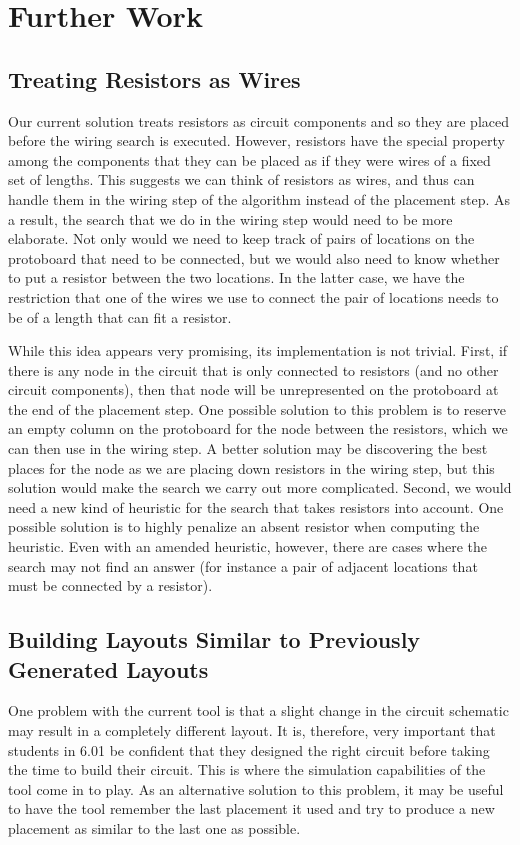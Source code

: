 \section{Further Work}

\subsection{Treating Resistors as Wires}

Our current solution treats resistors as circuit components and so they are
placed before the wiring search is executed.
However, resistors have the special property among the components that
they can be placed as if they were wires of a fixed set of lengths.
This suggests we can think of resistors as wires,
and thus can handle them in the wiring step of the algorithm instead of
the placement step. As a result, the search that we do in the wiring step would
need to be
more elaborate. Not only would we need to keep track of pairs of locations on the
protoboard that need to be connected, but we would also need to know whether to
put a resistor between the two locations. In the latter case, we have the
restriction that one of the wires we use to connect the pair of locations needs
to be of a length that can fit a resistor.

While this idea appears very promising, its implementation is not trivial.
First, if there is any node in the circuit that is only
connected to resistors (and no other circuit components), then that node will be
unrepresented on the protoboard at the end of the placement step. One possible
solution to this problem is to reserve an empty column on the
protoboard for the node between the resistors, which we can then use in the
wiring step. A better solution may
be discovering the best places for the node as we are placing down resistors in
the wiring step, but this solution would make the search we carry out
more complicated. Second, we would need a new kind of heuristic for the
search that takes resistors into account. One possible solution is to highly
penalize an absent resistor when computing the heuristic.
Even with an amended heuristic, however, there
are cases where the search may not find an answer (for instance a pair of
adjacent locations that must be connected by a resistor).

\subsection{Building Layouts Similar to Previously Generated Layouts}
One problem with the current tool is that a slight change in
the circuit schematic may result in a completely different layout. It is,
therefore, very important that students in 6.01 be confident that they designed
the right circuit before taking the time to build their circuit.
This is where the simulation
capabilities of the tool come in to play. As an alternative solution to this
problem, it may be useful to have the
tool remember the last placement it used and try to produce a new placement as
similar to the last one as possible.

